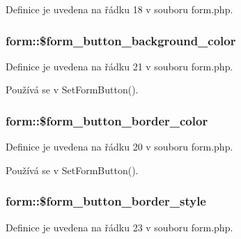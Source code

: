 Definice je uvedena na řádku 18 v souboru form.\-php.

\hypertarget{classform_a2d0582597db58dceca0e7cdfafc8ddf3}{
\subsubsection[{\$form\-\_\-button\-\_\-background\-\_\-color}]{\setlength{\rightskip}{0pt plus 5cm}form\-::\$form\-\_\-button\-\_\-background\-\_\-color}}\label{classform_a2d0582597db58dceca0e7cdfafc8ddf3}


Definice je uvedena na řádku 21 v souboru form.\-php.



Používá se v Set\-Form\-Button().

\hypertarget{classform_af26f0d73e6b28146a9272c7ebe5ad3e4}{
\subsubsection[{\$form\-\_\-button\-\_\-border\-\_\-color}]{\setlength{\rightskip}{0pt plus 5cm}form\-::\$form\-\_\-button\-\_\-border\-\_\-color}}\label{classform_af26f0d73e6b28146a9272c7ebe5ad3e4}


Definice je uvedena na řádku 20 v souboru form.\-php.



Používá se v Set\-Form\-Button().

\hypertarget{classform_a1cfa1f479abb66109c34488ec49f08d4}{
\subsubsection[{\$form\-\_\-button\-\_\-border\-\_\-style}]{\setlength{\rightskip}{0pt plus 5cm}form\-::\$form\-\_\-button\-\_\-border\-\_\-style}}\label{classform_a1cfa1f479abb66109c34488ec49f08d4}


Definice je uvedena na řádku 23 v souboru form.\-php.

